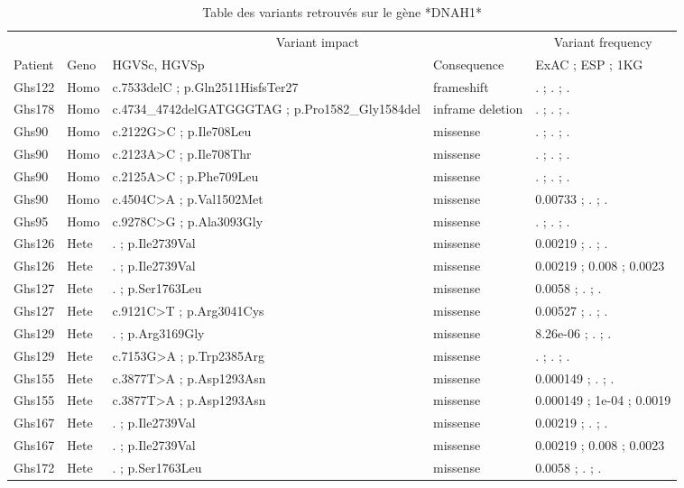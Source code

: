 \documentclass[12pt,twoside]{reedthesis}
\theoremstyle{definition}
\theoremstyle{definition}
\theoremstyle{remark}
\begin{document}
  \begin{landscape}
  \begin{longtable}[t]{lllll}
  \caption{\label{tab:tabdnah1}Table des variants retrouvés sur le gène *DNAH1*}\\
  \toprule
  \multicolumn{2}{c}{ } & \multicolumn{2}{c}{Variant impact} & \multicolumn{1}{c}{Variant frequency} \\
  \cmidrule(l{2pt}r{2pt}){3-4} \cmidrule(l{2pt}r{2pt}){5-5}
  Patient & Geno & HGVSc, HGVSp & Consequence & ExAC ; ESP ; 1KG\\
  \midrule
  Ghs122 & Homo & c.7533delC ; p.Gln2511HisfsTer27 & frameshift & . ; . ; .\\
  Ghs178 & Homo & c.4734\_4742delGATGGGTAG ; p.Pro1582\_Gly1584del & inframe deletion & . ; . ; .\\
  Ghs90 & Homo & c.2122G>C ; p.Ile708Leu & missense & . ; . ; .\\
  Ghs90 & Homo & c.2123A>C ; p.Ile708Thr & missense & . ; . ; .\\
  Ghs90 & Homo & c.2125A>C ; p.Phe709Leu & missense & . ; . ; .\\
  \addlinespace
  Ghs90 & Homo & c.4504C>A ; p.Val1502Met & missense & 0.00733 ; . ; .\\
  Ghs95 & Homo & c.9278C>G ; p.Ala3093Gly & missense & . ; . ; .\\
  Ghs126 & Hete & . ; p.Ile2739Val & missense & 0.00219 ; . ; .\\
  Ghs126 & Hete & . ; p.Ile2739Val & missense & 0.00219 ; 0.008 ; 0.0023\\
  Ghs127 & Hete & . ; p.Ser1763Leu & missense & 0.0058 ; . ; .\\
  \addlinespace
  Ghs127 & Hete & c.9121C>T ; p.Arg3041Cys & missense & 0.00527 ; . ; .\\
  Ghs129 & Hete & . ; p.Arg3169Gly & missense & 8.26e-06 ; . ; .\\
  Ghs129 & Hete & c.7153G>A ; p.Trp2385Arg & missense & . ; . ; .\\
  Ghs155 & Hete & c.3877T>A ; p.Asp1293Asn & missense & 0.000149 ; . ; .\\
  Ghs155 & Hete & c.3877T>A ; p.Asp1293Asn & missense & 0.000149 ; 1e-04 ; 0.0019\\
  \addlinespace
  Ghs167 & Hete & . ; p.Ile2739Val & missense & 0.00219 ; . ; .\\
  Ghs167 & Hete & . ; p.Ile2739Val & missense & 0.00219 ; 0.008 ; 0.0023\\
  Ghs172 & Hete & . ; p.Ser1763Leu & missense & 0.0058 ; . ; .\\

\end{longtable}
\end{landscape}
\end{document}
